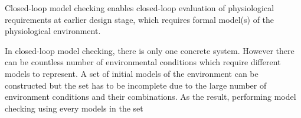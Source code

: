 Closed-loop model checking enables closed-loop evaluation of physiological requirements at earlier design stage, which requires formal model(s) of the physiological environment. 

In closed-loop model checking, there is only one concrete system. However there can be countless number of environmental conditions which require different models to represent. A set of initial models of the environment can be constructed but the set has to be incomplete due to the large number of environment conditions and their combinations. As the result, performing model checking using every models in the set

